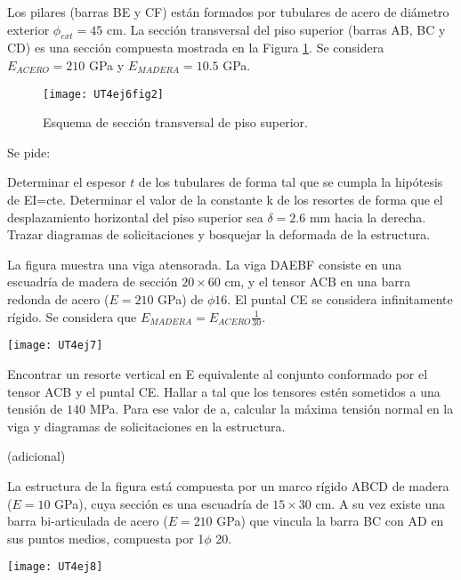 Los pilares (barras BE y CF) están formados por tubulares de acero de diámetro exterior $\phi_{ext} = 45$ cm. %
%
La sección transversal del piso superior (barras AB, BC y CD) es una sección compuesta mostrada en la Figura \ref{fig62}. %
%
Se considera $E_{ACERO} = 210$ GPa y $E_{MADERA} = 10.5$ GPa.

\begin{figure}[htb]
	\centering
	\texttt{[image: UT4ej6fig2]}
	\caption{Esquema de sección transversal de piso superior.}
	\label{fig62}
\end{figure}
%

Se pide:

\parte Determinar el espesor $t$ de los tubulares de forma tal que se cumpla la hipótesis de EI=cte.
\parte Determinar el valor de la constante k de los resortes de forma que el desplazamiento horizontal del piso superior sea $\delta =2.6$ mm hacia la derecha.
\parte Trazar diagramas de solicitaciones y bosquejar la deformada de la estructura.



\ejercicio

La figura muestra una viga atensorada. La viga DAEBF consiste en una escuadría de madera de sección $20 \times 60$ cm, y el tensor ACB en una barra redonda de acero ($E=210$ GPa) de $\phi 16$. %
%
El puntal CE se considera infinitamente rígido. Se considera que $ E_{MADERA} = E_{ACERO} \frac{1}{30}$.

\begin{center}
	\texttt{[image: UT4ej7]}
\end{center}

\parte Encontrar un resorte vertical en E equivalente al conjunto conformado por el tensor ACB y el puntal CE.
\parte Hallar  a tal que  los tensores estén sometidos a una tensión de $140$ MPa.
\parte Para ese valor de a, calcular la máxima tensión normal en la viga y diagramas de solicitaciones en la estructura.


\ejercicio (adicional) 

La estructura de la figura está compuesta por un marco rígido ABCD de madera ($E=10$ GPa), cuya sección es una escuadría de $15 \times 30$ cm. A su vez existe una barra bi-articulada de acero ($E=210$ GPa) que vincula la barra BC con AD en sus puntos medios, compuesta por 1$\phi$ 20.

\begin{center}
	\texttt{[image: UT4ej8]}
\end{center}


